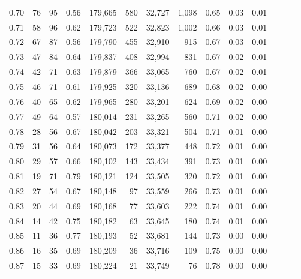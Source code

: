 \begin{tabular}{rrrrrrrrrrrrrr}
0.70 &      76 &     95 &  0.56 &  179,665 &      580 &  32,727 &   1,098 &  0.65 &  0.03 &      0.01 \\
0.71 &      58 &     96 &  0.62 &  179,723 &      522 &  32,823 &   1,002 &  0.66 &  0.03 &      0.01 \\
0.72 &      67 &     87 &  0.56 &  179,790 &      455 &  32,910 &     915 &  0.67 &  0.03 &      0.01 \\
0.73 &      47 &     84 &  0.64 &  179,837 &      408 &  32,994 &     831 &  0.67 &  0.02 &      0.01 \\
0.74 &      42 &     71 &  0.63 &  179,879 &      366 &  33,065 &     760 &  0.67 &  0.02 &      0.01 \\
0.75 &      46 &     71 &  0.61 &  179,925 &      320 &  33,136 &     689 &  0.68 &  0.02 &      0.00 \\
0.76 &      40 &     65 &  0.62 &  179,965 &      280 &  33,201 &     624 &  0.69 &  0.02 &      0.00 \\
0.77 &      49 &     64 &  0.57 &  180,014 &      231 &  33,265 &     560 &  0.71 &  0.02 &      0.00 \\
0.78 &      28 &     56 &  0.67 &  180,042 &      203 &  33,321 &     504 &  0.71 &  0.01 &      0.00 \\
0.79 &      31 &     56 &  0.64 &  180,073 &      172 &  33,377 &     448 &  0.72 &  0.01 &      0.00 \\
0.80 &      29 &     57 &  0.66 &  180,102 &      143 &  33,434 &     391 &  0.73 &  0.01 &      0.00 \\
0.81 &      19 &     71 &  0.79 &  180,121 &      124 &  33,505 &     320 &  0.72 &  0.01 &      0.00 \\
0.82 &      27 &     54 &  0.67 &  180,148 &       97 &  33,559 &     266 &  0.73 &  0.01 &      0.00 \\
0.83 &      20 &     44 &  0.69 &  180,168 &       77 &  33,603 &     222 &  0.74 &  0.01 &      0.00 \\
0.84 &      14 &     42 &  0.75 &  180,182 &       63 &  33,645 &     180 &  0.74 &  0.01 &      0.00 \\
0.85 &      11 &     36 &  0.77 &  180,193 &       52 &  33,681 &     144 &  0.73 &  0.00 &      0.00 \\
0.86 &      16 &     35 &  0.69 &  180,209 &       36 &  33,716 &     109 &  0.75 &  0.00 &      0.00 \\
0.87 &      15 &     33 &  0.69 &  180,224 &       21 &  33,749 &      76 &  0.78 &  0.00 &      0.00 \\

\end{tabular}
